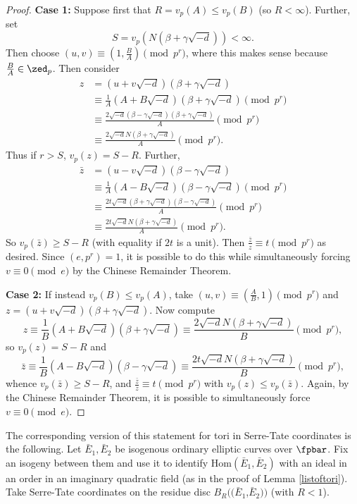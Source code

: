 \documentclass[12pt,letterpaper]{article}
\begin{document}
\begin{proof}
		\textbf{Case 1:} Suppose first that $R = v_p(A) \leq v_p(B)$ (so $R<\infty$). Further, set \[S = v_p(N(\beta+\gamma\sqrt{-d}))<\infty.\] Then choose $(u,v)\equiv(1,\frac{B}{A})\pmod{p^{r}}$, where this makes sense because $\frac{B}{A}\in \zed_p$. Then consider \begin{align*} z &= (u+v\sqrt{-d})(\beta+\gamma\sqrt{-d})  \\ &\equiv \frac{1}{A}(A+B\sqrt{-d})(\beta+\gamma\sqrt{-d}) \pmod{p^r} \\ &\equiv \frac{2\sqrt{-d}(\beta-\gamma\sqrt{-d})(\beta+\gamma\sqrt{-d})}{A} \pmod{p^r}  \\ &\equiv \frac{2\sqrt{-d}N(\beta+\gamma\sqrt{-d})}{A}\pmod{p^r}.\end{align*} Thus if  $r>S$, $v_p(z) = S-R$. Further, \begin{align*} \bar{z} &= (u-v\sqrt{-d})(\beta-\gamma\sqrt{-d})  \\ &\equiv \frac{1}{A}(A-B\sqrt{-d})(\beta-\gamma\sqrt{-d}) \pmod{p^r} \\ &\equiv \frac{2t\sqrt{-d}(\beta+\gamma\sqrt{-d})(\beta-\gamma\sqrt{-d})}{A} \pmod{p^r} \\ &\equiv \frac{2t\sqrt{-d}N(\beta+\gamma\sqrt{-d})}{A}\pmod{p^r}.\end{align*} So $v_p(\bar{z}) \geq S-R$ (with equality if $2t$ is a unit). Then $\frac{\bar{z}}{z}\equiv t\pmod{p^r}$ as desired. Since $(e,p^r)=1$, it is possible to do this while simultaneously forcing $v\equiv 0\pmod{e}$ by the Chinese Remainder Theorem. 
		
		\textbf{Case 2:} If instead $v_p(B)\leq v_p(A)$, take $(u,v) \equiv (\frac{A}{B},1)\pmod{p^r}$ and $z = (u+v\sqrt{-d})(\beta+\gamma\sqrt{-d})$. Now compute
		 \[
		 z \equiv \frac{1}{B}(A+B\sqrt{-d})(\beta+\gamma\sqrt{-d}) \equiv \frac{2\sqrt{-d}N(\beta+\gamma\sqrt{-d})}{B}\pmod{p^r},
		\] so $v_p(z)=S-R$ and \[\bar{z}\equiv \frac{1}{B}(A-B\sqrt{-d})(\beta-\gamma\sqrt{-d}) \equiv \frac{2t\sqrt{-d}N(\beta+\gamma\sqrt{-d})}{B}\pmod{p^r},\] whence $v_p(\bar{z})\geq S-R$, and $\frac{\bar{z}}{z}\equiv t \pmod{p^r}$ with $v_p(z)\leq v_p(\bar{z})$. Again, by the Chinese Remainder Theorem, it is possible to simultaneously force $v\equiv 0\pmod{e}$. 
		\end{proof}
	
			

	The corresponding version of this statement for tori in Serre-Tate coordinates is the following. Let $\bar{E}_1,\bar{E}_2$ be isogenous ordinary elliptic curves over $\fpbar$. Fix an isogeny between them and use it to identify Hom$(\bar{E}_1,\bar{E}_2)$ with an ideal in an order in an imaginary quadratic field (as in the proof of Lemma \ref{listoftori}). Take Serre-Tate coordinates on the residue disc $B_R((\bar{E}_1$,$\bar{E}_2))$ (with $R<1$).
	 
\end{document}
